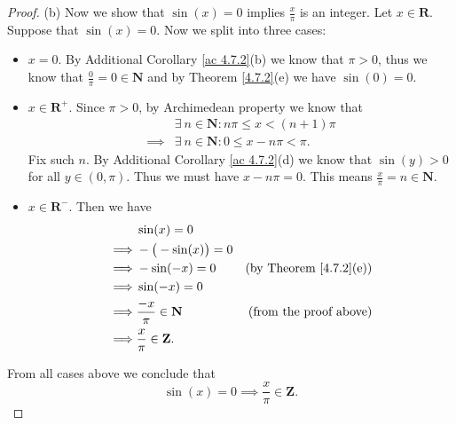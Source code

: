 \begin{proof}{(b)}
    Now we show that \(\sin(x) = 0\) implies \(\frac{x}{\pi}\) is an integer.
    Let \(x \in \mathbf{R}\).
    Suppose that \(\sin(x) = 0\).
    Now we split into three cases:
    \begin{itemize}
        \item \(x = 0\).
              By Additional Corollary \ref{ac 4.7.2}(b) we know that \(\pi > 0\), thus we know that \(\frac{0}{\pi} = 0 \in \mathbf{N}\) and by Theorem \ref{4.7.2}(e) we have \(\sin(0) = 0\).
        \item \(x \in \mathbf{R}^+\).
              Since \(\pi > 0\), by Archimedean property we know that
              \begin{align*}
                           & \exists\ n \in \mathbf{N} : n \pi \leq x < (n + 1) \pi \\
                  \implies & \exists\ n \in \mathbf{N} : 0 \leq x - n \pi < \pi.
              \end{align*}
              Fix such \(n\).
              By Additional Corollary \ref{ac 4.7.2}(d) we know that \(\sin(y) > 0\) for all \(y \in (0, \pi)\).
              Thus we must have \(x - n \pi = 0\).
              This means \(\frac{x}{\pi} = n \in \mathbf{N}\).
        \item \(x \in \mathbf{R}^-\).
              Then we have
              \begin{align*}
                           & \sin(x) = 0                                                        \\
                  \implies & -\big(-\sin(x)\big) = 0                                            \\
                  \implies & -\sin(-x) = 0                 & \text{(by Theorem \ref{4.7.2}(e))} \\
                  \implies & \sin(-x) = 0                                                       \\
                  \implies & \frac{-x}{\pi} \in \mathbf{N} & \text{(from the proof above)}      \\
                  \implies & \frac{x}{\pi} \in \mathbf{Z}.
              \end{align*}
    \end{itemize}
    From all cases above we conclude that
    \[
        \sin(x) = 0 \implies \frac{x}{\pi} \in \mathbf{Z}.
    \]
\end{proof}

